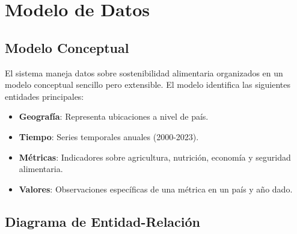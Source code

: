 \documentclass[11pt, a4paper]{report}
\begin{document}
\section{Modelo de Datos}

\subsection{Modelo Conceptual}

El sistema maneja datos sobre sostenibilidad alimentaria organizados en un modelo conceptual sencillo pero extensible. El modelo identifica las siguientes entidades principales:

\begin{itemize}
    \item \textbf{Geografía}: Representa ubicaciones a nivel de país.
    \item \textbf{Tiempo}: Series temporales anuales (2000-2023).
    \item \textbf{Métricas}: Indicadores sobre agricultura, nutrición, economía y seguridad alimentaria.
    \item \textbf{Valores}: Observaciones específicas de una métrica en un país y año dado.
\end{itemize}

\subsection{Diagrama de Entidad-Relación}
\end{document}
